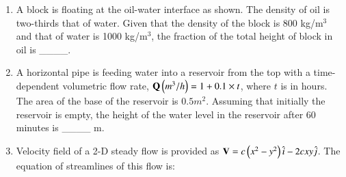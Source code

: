 \documentclass[journal,12pt,onecolumn]{IEEEtran}
\theoremstyle{remark}
\begin{document}
\begin{enumerate}
\begin{figure}[!ht]
\end{figure}


\item A block is floating at the oil-water interface as shown. The density of oil is two-thirds that of water. Given that the density of the block is 800 kg/m$^3$ and that of water is 1000 kg/m$^3$, the fraction of the total height of block in oil is \_\_\_\_.\\

\begin{figure}[!ht]
	\centering
	
\end{figure}

\item A horizontal pipe is feeding water into a reservoir from the top with a time-dependent volumetric flow rate, $\mathbf{Q}\left(m^{3}/h\right) = 1+0.1 \times t$, where $t$ is in hours. The area of the base of the reservoir is $0.5 m^2$. Assuming that initially the reservoir is empty, the height of the water level in the reservoir after 60 minutes is \_\_\_\_ m.\\

\item Velocity field of a 2-D steady flow is provided as $\mathbf{V} = c\left(x^2-y^2\right)\hat{i} - 2cxy\hat{j}$. The equation of streamlines of this flow is:

\begin{enumerate}
\end{enumerate}


\end{enumerate}
\end{document}
